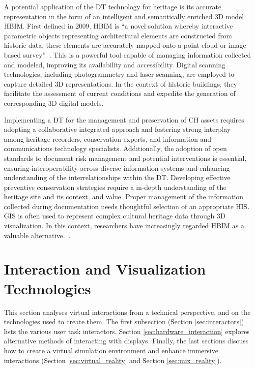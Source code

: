 A potential application of the \gls{DT} technology for heritage is its accurate
representation in the form of an intelligent and semantically enriched \gls{3D} model \gls{HBIM}.
First defined in 2009, HBIM is “a novel solution whereby interactive parametric objects representing architectural elements are constructed from historic data, these elements are accurately mapped onto a point cloud or image-based survey”~\cite{article_hbim}.
This is a powerful tool capable of managing information collected and modeled,
improving its availability and accessibility.
Digital scanning technologies, including photogrammetry and laser scanning, are employed to capture detailed \gls{3D} representations. In the context of historic buildings, they facilitate the assessment of current conditions and expedite the generation of corresponding \gls{3D} digital models.

Implementing a \gls{DT} for the management and preservation of \gls{CH} assets requires adopting a collaborative integrated approach and fostering strong interplay among heritage recorders, conservation experts, and information and communications technology specialists. 
Additionally, the adoption of open standards to document risk management and potential interventions is essential, ensuring interoperability across diverse information systems and enhancing understanding of the interrelationships within the \gls{DT}.
Developing effective preventive conservation strategies require a in-depth understanding of the heritage site and its context, and value.
Proper management of the information collected during documentation needs thoughtful selection of an appropriate \gls{HIS}.
\gls{GIS} is often used to represent complex cultural heritage data through \gls{3D} visualization. 
In this context, researchers have increasingly regarded \gls{HBIM} as a valuable alternative.~\cite{jouan2020digital}.


\section{Interaction and Visualization Technologies}
\label{sec:interaction_visualization}

This section analyses virtual interactions from a technical perspective, and on the technologies used to create them.
The first subsection (Section \ref{sec:interactors}) lists the various user task interactors. 
Section \ref{sec:hardware_interaction} explores alternative methods of interacting with displays. 
Finally, the last sections discuss how to create a virtual simulation environment and enhance immersive interactions (Section \ref{sec:virtual_reality} and Section  \ref{sec:mix_reality}).

